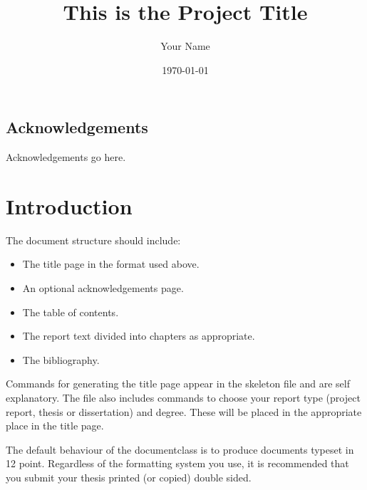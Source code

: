 \documentclass[bsc,frontabs,twoside,singlespacing,parskip,deptreport]{infthesis}
\begin{document}
\title{This is the Project Title}

\author{Your Name}


\date{\today}


\maketitle

\section*{Acknowledgements}
Acknowledgements go here. 

\tableofcontents



\chapter{Introduction}

The document structure should include:
\begin{itemize}
\item
The title page  in the format used above.
\item
An optional acknowledgements page.
\item
The table of contents.
\item
The report text divided into chapters as appropriate.
\item
The bibliography.
\end{itemize}

Commands for generating the title page appear in the skeleton file and
are self explanatory.
The file also includes commands to choose your report type (project
report, thesis or dissertation) and degree.
These will be placed in the appropriate place in the title page. 

The default behaviour of the documentclass is to produce documents typeset in
12 point.  Regardless of the formatting system you use, 
it is recommended that you submit your thesis printed (or copied) 
double sided.
\end{document}

